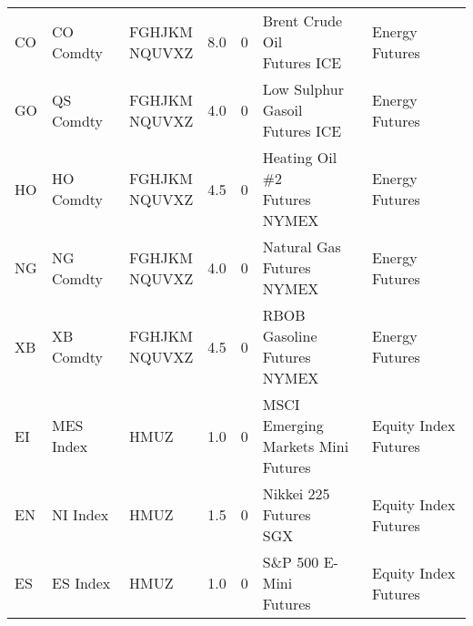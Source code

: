 \begin{longtable}{lllrrll}
                   CO &              CO Comdty & \makecell{FGHJKM\\NQUVXZ} &                               8.0 &                        0 &                    \makecell{Brent Crude Oil\\Futures ICE} &          Energy Futures \\
                   GO &              QS Comdty & \makecell{FGHJKM\\NQUVXZ} &                               4.0 &                        0 &                 \makecell{Low Sulphur Gasoil\\Futures ICE} &          Energy Futures \\
                   HO &              HO Comdty & \makecell{FGHJKM\\NQUVXZ} &                               4.5 &                        0 &                  \makecell{Heating Oil \#2\\Futures NYMEX} &          Energy Futures \\
                   NG &              NG Comdty & \makecell{FGHJKM\\NQUVXZ} &                               4.0 &                        0 &                      \makecell{Natural Gas Futures\\NYMEX} &          Energy Futures \\
                   XB &              XB Comdty & \makecell{FGHJKM\\NQUVXZ} &                               4.5 &                        0 &                    \makecell{RBOB Gasoline\\Futures NYMEX} &          Energy Futures \\
                   EI &              MES Index &                      HMUZ &                               1.0 &                        0 &             \makecell{MSCI Emerging\\Markets Mini Futures} &    Equity Index Futures \\
                   EN &               NI Index &                      HMUZ &                               1.5 &                        0 &                         \makecell{Nikkei 225 Futures\\SGX} &    Equity Index Futures \\
                   ES &               ES Index &                      HMUZ &                               1.0 &                        0 &                        \makecell{S\&P 500 E-Mini\\Futures} &    Equity Index Futures \\

\end{longtable}
